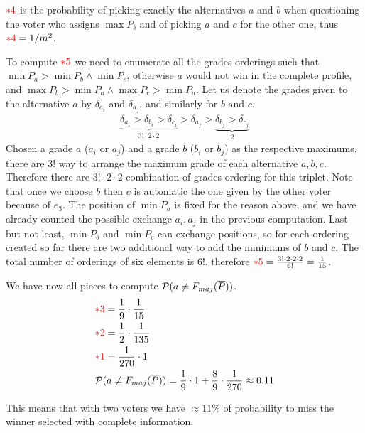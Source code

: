 \documentclass[version=3.21, pagesize, twoside=off, bibliography=totoc, DIV=calc, fontsize=12pt, a4paper]{scrartcl}
\begin{document}
${\color{red}*4}$ is the probability of picking exactly the alternatives $a$ and $b$ when questioning the voter who assigns $\max{P_{b}}$ and of picking $a$ and $c$ for the other one, thus ${\color{red}*4}=1/m^2$. 

To compute ${\color{red}*5}$ we need to enumerate all the grades orderings such that $\min{P_{a}}>\min{P_{b}}\wedge \min{P_{c}}$, otherwise $a$ would not win in the complete profile, and $\max{P_{b}}>\min{P_{a}}\wedge \max{P_{c}}>\min{P_{a}}$. Let us denote the grades given to the alternative $a$ by $\delta_{a_i}$ and $\delta_{a_j}$, and similarly for $b$ and $c$.
\begin{align}
	\underbrace{\delta_{a_i}>\delta_{b_i}>\delta_{c_i}}_{3!\cdot 2\cdot 2}>\delta_{a_j}>\underbrace{\delta_{b_j}>\delta_{c_j}}_{2}
\end{align}
Chosen a grade $a$ ($a_i$ or $a_j$) and a grade $b$ ($b_i$ or $b_j$) as the respective maximums, there are $3!$ way to arrange the maximum grade of each alternative $a, b, c$. Therefore there are $3! \cdot 2 \cdot 2$ combination of grades ordering for this triplet. Note that once we choose $b$ then $c$ is automatic the one given by the other voter because of $e_3$. The position of $\min{P_{a}}$ is fixed for the reason above, and we have already counted the possible exchange $a_i, a_j$ in the previous computation. Last but not least, $\min{P_{b}}$ and $\min{P_{c}}$ can exchange positions, so for each ordering created so far there are two additional way to add the minimums of $b$ and $c$. The total number of orderings of six elements is $6!$, therefore ${\color{red}*5}= \frac{3!\cdot 2\cdot 2\cdot2}{6!}=\frac{1}{15}$.

We have now all pieces to compute $\mathcal{P}(a\neq F_{maj}(\overline{P}))$. 
\begin{align}
	&{\color{red}*3} = \frac{1}{9} \cdot \frac{1}{15} \\
	&{\color{red}*2} =\frac{1}{2} \cdot \frac{1}{135} \\
	&{\color{red}*1} =\frac{1}{270} \cdot 1 \\
	&\mathcal{P}(a\neq F_{maj}(\overline{P})) = \frac{1}{9} \cdot 1 + \frac{8}{9} \cdot \frac{1}{270} \approx 0.11
\end{align}

This means that with two voters we have $\approx 11\%$ of probability to miss the winner selected with complete information.
\end{document}

